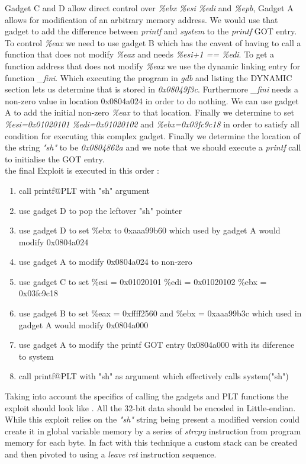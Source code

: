 Gadget C and D allow direct control over \emph{\%ebx} \emph{\%esi} \emph{\%edi} and \emph{\%epb}, Gadget A allows for modification of an arbitrary memory address. We would use that gadget to add the difference between \emph{printf} and \emph{system} to the \emph{printf} GOT entry. To control \emph{\%eax} we need to use gadget B which has the caveat of having to call a function that does not modify \emph{\%eax} and needs \emph{\%esi+1 == \%edi}. To get a function address that does not modify \emph{\%eax} we use the dynamic linking entry for function \emph{\_fini}. Which executing the program in \emph{gdb} and listing the DYNAMIC section lets us determine that is stored in \emph{0x08049f3c}. Furthermore \emph{\_fini} needs a non-zero value in location 0x0804a024 in order to do nothing. We can use gadget A to add the initial non-zero \emph{\%eax} to that location. Finally we determine to set \emph{\%esi=0x01020101} \emph{\%edi=0x01020102} and \emph{\%ebx=0x03fc9c18} in order to satisfy all condition for executing this complex gadget. Finally we determine the location of the string \emph{"sh"} to be \emph{0x0804862a} and we note that we should execute a \emph{printf} call to initialise the GOT entry. \\
the final Exploit is executed in this order :
\begin{enumerate}
\item call printf@PLT with "sh" argument
\item use gadget D to pop the leftover "sh" pointer
\item use gadget D to set \%ebx to 0xaaa99b60 which used by gadget A would modify 0x0804a024
\item use gadget A to modify 0x0804a024 to non-zero
\item use gadget C to set \%esi = 0x01020101 \%edi = 0x01020102 \%ebx = 0x03fc9c18
\item use gadget B to set \%eax = 0xffff2560 and \%ebx = 0xaaa99b3c which used in gadget A would modify 0x0804a000
\item use gadget A to modify the printf GOT entry 0x0804a000 with its diference to system
\item call printf@PLT with "sh" as argument which effectively calls system("sh")
\end{enumerate}
Taking into account the specifics of calling the gadgets and PLT functions the exploit should look like . All the 32-bit data should be encoded in Little-endian. While this exploit relies on the \emph{"sh"} string being present a modified version could create it in global variable memory by a series of \emph{strcpy} instruction from program memory for each byte. In fact with this technique a custom stack can be created and then pivoted to using a \emph{leave} \emph{ret} instruction sequence.
